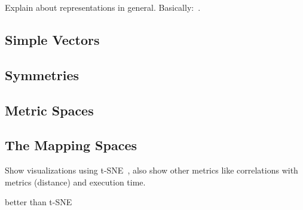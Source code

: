 Explain about representations in general. Basically:~\cite{goens_mcsoc18}.
\subsection{Simple Vectors}

\subsection{Symmetries}

\subsection{Metric Spaces}

\subsection{The Mapping Spaces}
Show visualizations using t-SNE~\cite{tsne}, also show other metrics like
correlations with metrics (distance) and execution time.

\cite{li2018visualizing} better than t-SNE